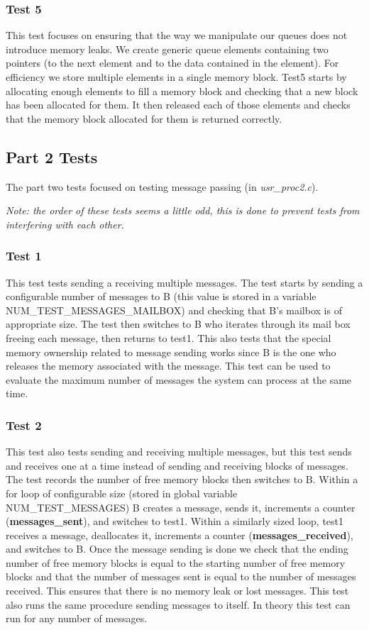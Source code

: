 \documentclass[11pt, oneside]{article}
\begin{document}
\subsubsection{Test 5}
This test focuses on ensuring that the way we manipulate our queues does not introduce memory leaks. We create generic queue elements containing two pointers (to the next element and to the data contained in the element). For efficiency we store multiple elements in a single memory block. Test5 starts by allocating enough elements to fill a memory block and checking that a new block has been allocated for them. It then released each of those elements and checks that the memory block allocated for them is returned correctly.

\subsection{Part 2 Tests}
The part two tests focused on testing message passing (in \textit{usr\_proc2.c}).

\textit{Note: the order of these tests seems a little odd, this is done to prevent tests from interfering with each other.}
\subsubsection{Test 1}
This test tests sending a receiving multiple messages. The test starts by sending a configurable number of messages to B (this value is stored in a variable NUM\_TEST\_MESSAGES\_MAILBOX) and checking that B's mailbox is of appropriate size. The test then switches to B who iterates through its mail box freeing each message, then returns to test1. This also tests that the special memory ownership related to message sending works since B is the one who releases the memory associated with the message.  This test can be used to evaluate the maximum number of messages the system can process at the same time.
\subsubsection{Test 2}
This test also tests sending and receiving multiple messages, but this test sends and receives one at a time instead of sending and receiving blocks of messages. The test records the number of free memory blocks then switches to B. Within a for loop of configurable size (stored in global variable NUM\_TEST\_MESSAGES) B creates a message, sends it, increments a counter (\textbf{messages\_sent}), and switches to test1. Within a similarly sized loop, test1 receives a message, deallocates it, increments a counter (\textbf{messages\_received}), and switches to B. Once the message sending is done we check that the ending number of free memory blocks is equal to the starting number of free memory blocks and that the number of messages sent is equal to the number of messages received. This ensures that there is no memory leak or lost messages. This test also runs the same procedure sending messages to itself. In theory this test can run for any number of messages.
\end{document}
